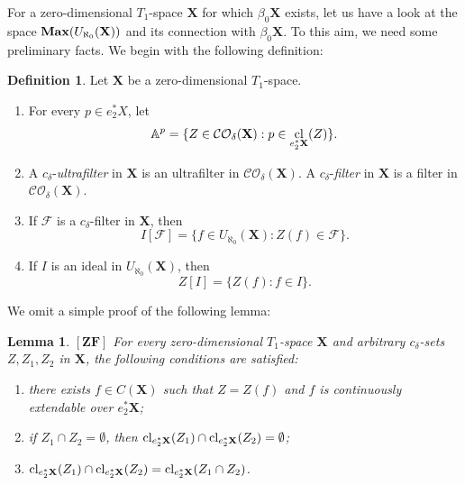 \documentclass[12pt,twoside,leqno]{article}
\theoremstyle{plain}
\newtheorem{lemma}[theorem]{Lemma}
\theoremstyle{definition}
\newtheorem{definition}[theorem]{Definition}
\theoremstyle{remark}
\DeclareMathOperator{\cl}{{\rm cl}}
\DeclareMathOperator{\BMax}{\bf{Max}}
\begin{document}
For a zero-dimensional $T_1$-space $\mathbf{X}$ for which $\beta_0\mathbf{X}$ exists, let us have a look at the space $\BMax(U_{\aleph_0}(\mathbf{X}))$ and its connection with $\beta_0\mathbf{X}$. To this aim, we need some preliminary facts. We begin with the following definition:

\begin{definition}
	\label{s2:d18}
	Let $\mathbf{X}$ be a zero-dimensional $T_1$-space.
	\begin{enumerate}
		\item[(i)] For every $p\in e_{2}^{\ast} X$, let 
		$$\mathbb{A}^p=\{Z\in\mathcal{CO}_{\delta}(\mathbf{X}): p\in\cl_{e_{2}^{\ast}\mathbf{X}}(Z)\}.$$
		\item[(ii)] A $c_{\delta}$-\emph{ultrafilter} in $\mathbf{X}$ is an ultrafilter in $\mathcal{CO}_{\delta}(\mathbf{X})$. A $c_{\delta}$-\emph{filter} in $\mathbf{X}$ is a filter in $\mathcal{CO}_{\delta}(\mathbf{X})$.
		\item[(iii)] If $\mathcal{F}$ is a $c_{\delta}$-filter in $\mathbf{X}$, then
		$$I[\mathcal{F}]=\{f\in U_{\aleph_0}(\mathbf{X}): Z(f)\in\mathcal{F}\}.$$
		\item[(iv)] If $I$ is an ideal in $U_{\aleph_0}(\mathbf{X})$, then 
		$$Z[I]=\{ Z(f): f\in I\}.$$
	\end{enumerate}
\end{definition}

We omit a simple proof of the following lemma:
\begin{lemma}
	\label{s2:l19}
	$[\mathbf{ZF}]$ For every zero-dimensional $T_1$-space  $\mathbf{X}$ and arbitrary $c_{\delta}$-sets $Z, Z_1,Z_2$ in $\mathbf{X}$, the following conditions are satisfied:
	\begin{enumerate}
		\item[(i)] there exists $f\in C(\mathbf{X})$ such that $Z=Z(f)$ and $f$ is continuously extendable over $e_{2}^{\ast}\mathbf{X}$;
		\item[(ii)] if $Z_1\cap Z_2=\emptyset$, then $\cl_{e_{2}^{\ast}\mathbf{X}}(Z_1)\cap \cl_{e_{2}^{\ast}\mathbf{X}}(Z_2)=\emptyset$;
		\item[(iii)] $\cl_{e_{2}^{\ast}\mathbf{X}}(Z_1)\cap \cl_{e_{2}^{\ast}\mathbf{X}}(Z_2)= \cl_{e_{2}^{\ast}\mathbf{X}}(Z_1\cap Z_2)$.
	\end{enumerate}
\end{lemma}
\end{document}
